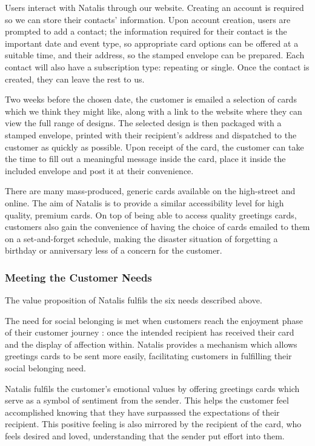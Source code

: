 \documentclass[10pt,a4paper]{article}
\begin{document}
Users interact with Natalis through our website. Creating an account is required so we can store their contacts' information. Upon account creation, users are prompted to add a contact; the information required for their contact is the important date and event type, so appropriate card options can be offered at a suitable time, and their address, so the stamped envelope can be prepared. Each contact will also have a subscription type: repeating or single. Once the contact is created, they can leave the rest to us.

Two weeks before the chosen date, the customer is emailed a selection of cards which we think they might like, along with a link to the website where they can view the full range of designs. The selected design is then packaged with a stamped envelope, printed with their recipient's address and dispatched to the customer as quickly as possible. Upon receipt of the card, the customer can take the time to fill out a meaningful message inside the card, place it inside the included envelope and post it at their convenience.

There are many mass-produced, generic cards available on the high-street and online. The aim of Natalis is to provide a similar accessibility level for high quality, premium cards. On top of being able to access quality greetings cards, customers also gain the convenience of having the choice of cards emailed to them on a set-and-forget schedule, making the disaster situation of forgetting a birthday or anniversary less of a concern for the customer.

\subsubsection*{Meeting the Customer Needs}
The value proposition of Natalis fulfils the six needs described above.

The need for social belonging is met when customers reach the enjoyment phase of their customer journey \citep{edelman2015competing}: once the intended recipient has received their card and the display of affection within. Natalis provides a mechanism which allows greetings cards to be sent more easily, facilitating customers in fulfilling their social belonging need.


Natalis fulfils the customer's emotional values by offering greetings cards which serve as a symbol of sentiment from the sender. This helps the customer feel accomplished knowing that they have surpasssed the expectations of their recipient. This positive feeling is also mirrored by the recipient of the card, who feels desired and loved, understanding that the sender put effort into them.
\end{document}

